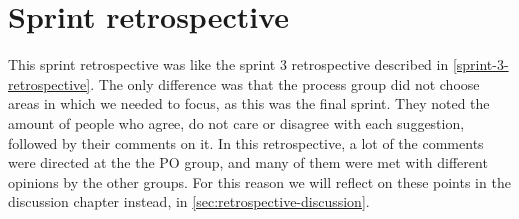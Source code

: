 \section{Sprint retrospective}\label{sec:sprint-4-retrospective}
This sprint retrospective was like the sprint 3 retrospective described in \autoref{sprint-3-retrospective}.
The only difference was that the process group did not choose areas in which we needed to focus, as this was the final sprint.
They noted the amount of people who agree, do not care or disagree with each suggestion, followed by their comments on it.
In this retrospective, a lot of the comments were directed at the the PO group, and many of them were met with different opinions by the other groups. 
For this reason we will reflect on these points in the discussion chapter instead, in \autoref{sec:retrospective-discussion}.
